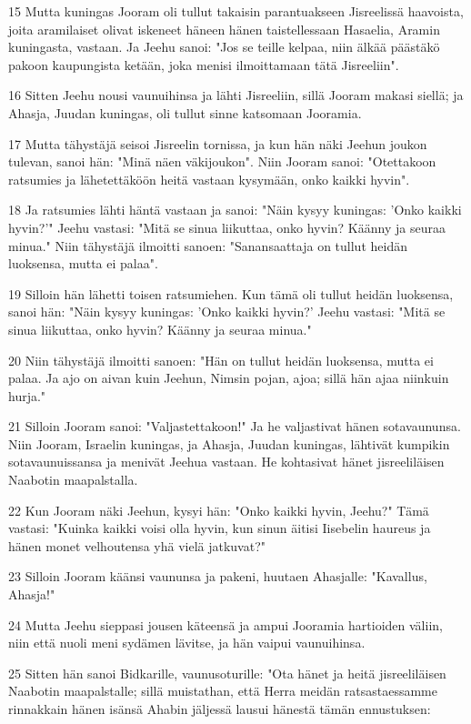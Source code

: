 \par 15 Mutta kuningas Jooram oli tullut takaisin parantuakseen Jisreelissä haavoista, joita aramilaiset olivat iskeneet häneen hänen taistellessaan Hasaelia, Aramin kuningasta, vastaan. Ja Jeehu sanoi: "Jos se teille kelpaa, niin älkää päästäkö pakoon kaupungista ketään, joka menisi ilmoittamaan tätä Jisreeliin".
\par 16 Sitten Jeehu nousi vaunuihinsa ja lähti Jisreeliin, sillä Jooram makasi siellä; ja Ahasja, Juudan kuningas, oli tullut sinne katsomaan Jooramia.
\par 17 Mutta tähystäjä seisoi Jisreelin tornissa, ja kun hän näki Jeehun joukon tulevan, sanoi hän: "Minä näen väkijoukon". Niin Jooram sanoi: "Otettakoon ratsumies ja lähetettäköön heitä vastaan kysymään, onko kaikki hyvin".
\par 18 Ja ratsumies lähti häntä vastaan ja sanoi: "Näin kysyy kuningas: 'Onko kaikki hyvin?'" Jeehu vastasi: "Mitä se sinua liikuttaa, onko hyvin? Käänny ja seuraa minua." Niin tähystäjä ilmoitti sanoen: "Sanansaattaja on tullut heidän luoksensa, mutta ei palaa".
\par 19 Silloin hän lähetti toisen ratsumiehen. Kun tämä oli tullut heidän luoksensa, sanoi hän: "Näin kysyy kuningas: 'Onko kaikki hyvin?' Jeehu vastasi: "Mitä se sinua liikuttaa, onko hyvin? Käänny ja seuraa minua."
\par 20 Niin tähystäjä ilmoitti sanoen: "Hän on tullut heidän luoksensa, mutta ei palaa. Ja ajo on aivan kuin Jeehun, Nimsin pojan, ajoa; sillä hän ajaa niinkuin hurja."
\par 21 Silloin Jooram sanoi: "Valjastettakoon!" Ja he valjastivat hänen sotavaununsa. Niin Jooram, Israelin kuningas, ja Ahasja, Juudan kuningas, lähtivät kumpikin sotavaunuissansa ja menivät Jeehua vastaan. He kohtasivat hänet jisreeliläisen Naabotin maapalstalla.
\par 22 Kun Jooram näki Jeehun, kysyi hän: "Onko kaikki hyvin, Jeehu?" Tämä vastasi: "Kuinka kaikki voisi olla hyvin, kun sinun äitisi Iisebelin haureus ja hänen monet velhoutensa yhä vielä jatkuvat?"
\par 23 Silloin Jooram käänsi vaununsa ja pakeni, huutaen Ahasjalle: "Kavallus, Ahasja!"
\par 24 Mutta Jeehu sieppasi jousen käteensä ja ampui Jooramia hartioiden väliin, niin että nuoli meni sydämen lävitse, ja hän vaipui vaunuihinsa.
\par 25 Sitten hän sanoi Bidkarille, vaunusoturille: "Ota hänet ja heitä jisreeliläisen Naabotin maapalstalle; sillä muistathan, että Herra meidän ratsastaessamme rinnakkain hänen isänsä Ahabin jäljessä lausui hänestä tämän ennustuksen:
